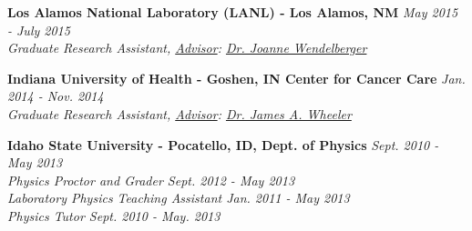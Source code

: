 
\workspace
    \textbf{Los Alamos National Laboratory (LANL) - Los Alamos, NM} \hfill \textit{May 2015 - July 2015}\\
    \textit{Graduate Research Assistant, \underline{Advisor}:  \href{http://www.lanl.gov/expertise/profiles/view/joanne-wendelberger}{Dr. Joanne Wendelberger}}
    
\workspace
    \textbf{Indiana University of Health - Goshen, IN Center for Cancer Care} \hfill \textit{Jan. 2014 - Nov. 2014}\\
    \textit{Graduate Research Assistant, \underline{Advisor}: \href{http://iuhealth.org/find-a-doctor/physician/69771/}{Dr. James A. Wheeler}}
    
\workspace
    \textbf{Idaho State University - Pocatello, ID, Dept. of Physics} \hfill \textit{Sept. 2010 - May 2013}\\
    \textit{Physics Proctor and Grader \hfill Sept. 2012 - May 2013}\\
    \textit{Laboratory Physics Teaching Assistant \hfill Jan. 2011 - May 2013}\\
    \textit{Physics Tutor \hfill Sept. 2010 - May. 2013}
    
